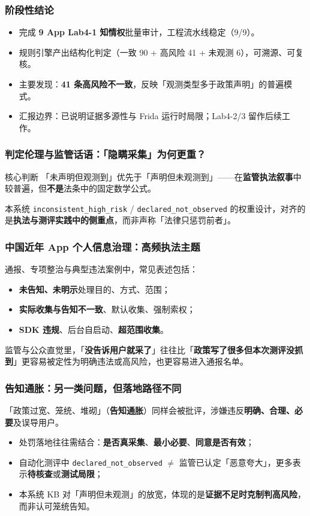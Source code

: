 \documentclass[AutoFakeBold,AutoFakeSlant]{beamer}
\begin{document}
\begin{frame}
    \frametitle{阶段性结论}
    \small
    \begin{itemize}
        \item 完成 \textbf{9 App Lab4-1 知情权}批量审计，工程流水线稳定（9/9）。
        \item 规则引擎产出结构化判定（一致 90 + 高风险 41 + 未观测 6），可溯源、可复核。
        \item 主要发现：\textbf{41 条高风险不一致}，反映「观测类型多于政策声明」的普遍模式。
        \item 汇报边界：已说明证据多源性与 Frida 运行时局限；Lab4-2/3 留作后续工作。
    \end{itemize}
\end{frame}

\begin{frame}
    \frametitle{判定伦理与监管话语：「隐瞒采集」为何更重？}
    \small
    \begin{block}{核心判断}
        「未声明但观测到」优先于「声明但未观测到」——在\textbf{监管执法叙事}中较普遍，但\textbf{不是}法条中的固定数学公式。
    \end{block}
    \vspace{0.2em}
    本系统 \texttt{inconsistent\_high\_risk} / \texttt{declared\_not\_observed} 的权重设计，对齐的是\textbf{执法与测评实践中的侧重点}，而非声称「法律只惩罚前者」。
\end{frame}

\begin{frame}
    \frametitle{中国近年 App 个人信息治理：高频执法主题}
    \small
    通报、专项整治与典型违法案例中，常见表述包括：
    \begin{itemize}
        \item \textbf{未告知、未明示}处理目的、方式、范围；
        \item \textbf{实际收集与告知不一致}、默认收集、强制索权；
        \item \textbf{SDK 违规}、后台自启动、\textbf{超范围收集}。
    \end{itemize}
    \vspace{0.3em}
    监管与公众直觉里，「\textbf{没告诉用户就采了}」往往比「\textbf{政策写了很多但本次测评没抓到}」更容易被定性为明确违法或高风险，也更容易进入通报名单。
\end{frame}

\begin{frame}
    \frametitle{告知通胀：另一类问题，但落地路径不同}
    \small
    「政策过宽、笼统、堆砌」（\textbf{告知通胀}）同样会被批评，涉嫌违反\textbf{明确、合理、必要}及误导用户。
    \begin{itemize}
        \item 处罚落地往往需结合：\textbf{是否真采集}、\textbf{最小必要}、\textbf{同意是否有效}；
        \item 自动化测评中 \texttt{declared\_not\_observed} $\neq$ 监管已认定「恶意夸大」，更多表示\textbf{待核查}或\textbf{测试局限}；
        \item 本系统 KB 对「声明但未观测」的放宽，体现的是\textbf{证据不足时克制判高风险}，而非认可笼统告知。
    \end{itemize}
\end{frame}
\end{document}
